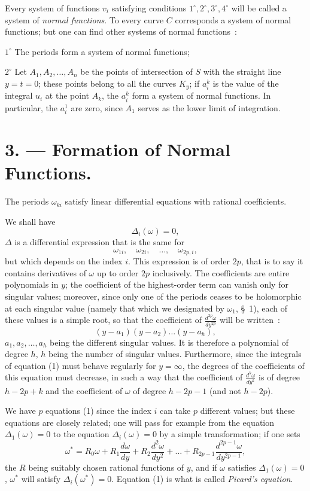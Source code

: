 \documentclass{article}
\begin{document}
Every system of functions $v_{i}$ satisfying conditions $1^{\circ}, 2^{\circ}, 3^{\circ}, 4^{\circ}$ will be called a system of \emph{normal functions}. To every curve $C$ corresponds a system of normal functions; but one can find other systems of normal functions~:

$1^{\circ}$ The periods form a system of normal functions;

$2^{\circ}$ Let $A_{1}, A_{2}, \ldots, A_{n}$ be the points of intersection of $S$ with the straight line $y = t = 0$; these points belong to all the curves $K_{y}$; if $a_{i}^{k}$ is the value of the integral $u_{i}$ at the point $A_{k}$, the $a_{i}^{k}$ form a system of normal functions. In particular, the $a_{i}^{1}$ are zero, since $A_{1}$ serves as the lower limit of integration.
\section*{3. --- Formation of Normal Functions.}

The periods $\omega_{ki}$ satisfy linear differential equations with rational coefficients.

We shall have
\[
\Delta_{i}(\omega) = 0, \tag{1}
\]
$\Delta$ is a differential expression that is the same for
\[
\omega_{1i}, \quad \omega_{2i}, \quad \ldots, \quad \omega_{2p,i},
\]
but which depends on the index $i$. This expression is of order $2p$, that is to say it contains derivatives of $\omega$ up to order $2p$ inclusively. The coefficients are entire polynomials in $y$; the coefficient of the highest-order term can vanish only for singular values; moreover, since only one of the periods ceases to be holomorphic at each singular value (namely that which we designated by $\omega_{1}$, \S~1), each of these values is a simple root, so that the coefficient of $\frac{d^{2p}\omega}{dy^{2p}}$ will be written~:
\[
(y - a_{1})(y - a_{2})\ldots(y - a_{h}),
\]
$a_{1}, a_{2}, \ldots, a_{h}$ being the different singular values. It is therefore a polynomial of degree $h$, $h$ being the number of singular values. Furthermore, since the integrals of equation (1) must behave regularly for $y = \infty$, the degrees of the coefficients of this equation must decrease, in such a way that the coefficient of $\frac{d^{k}\omega}{dy^{k}}$ is of degree $h - 2p + k$ and the coefficient of $\omega$ of degree $h - 2p - 1$ (and not $h - 2p$).

We have $p$ equations (1) since the index $i$ can take $p$ different values; but these equations are closely related; one will pass for example from the equation $\Delta_{1}(\omega) = 0$ to the equation $\Delta_{i}(\omega) = 0$ by a simple transformation; if one sets
\[
\omega^{*} = R_{0}\omega + R_{1}\frac{d\omega}{dy} + R_{2}\frac{d^{2}\omega}{dy^{2}} + \ldots + R_{2p-1}\frac{d^{2p-1}\omega}{dy^{2p-1}},
\]
the $R$ being suitably chosen rational functions of $y$, and if $\omega$
satisfies $\Delta_{1}(\omega) = 0$, $\omega^{*}$ will satisfy $\Delta_{i}(\omega^{*}) = 0$. Equation (1) is what is called \emph{Picard's equation}.
\end{document}
